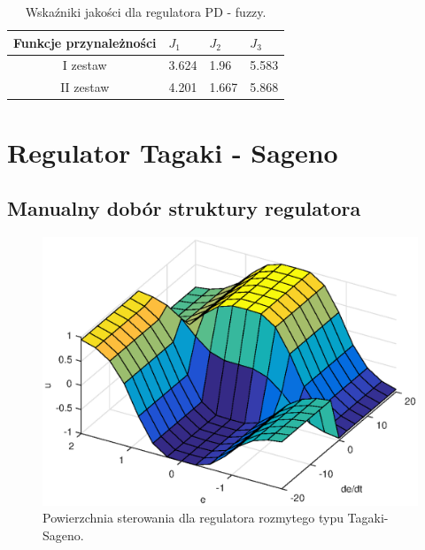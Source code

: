 \begin{table}[h]
	\caption{Wska\'zniki jakości dla regulatora PD - fuzzy.}
	\label{fuzzy_wsk}
	\centering
	
	\begin{tabular}{|c|M{2.5cm}|M{2.5cm}|M{2.5cm}|}
		\hline
		Funkcje przynależności &$J_1$&$J_2$&$J_3$\\
		\hline
		I zestaw &3.624&  1.96 &  5.583\\
		\hline
		II zestaw &4.201&  1.667 &  5.868\\
		\hline
				
	\end{tabular}
\end{table}

\section{Regulator Tagaki - Sageno}

\subsection{Manualny dobór struktury regulatora}
\begin{figure}[h!]
	\centering
	\includegraphics[scale = 0.8]{fig/sagenoManSurface.eps}
	\caption		
	{Powierzchnia sterowania dla regulatora rozmytego typu Tagaki-Sageno.}
	\label{fuzzy_sageno_sufraceMan}
\end{figure}

